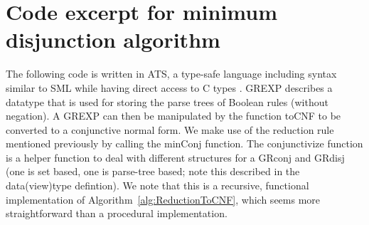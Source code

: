 \section{Code excerpt for minimum disjunction algorithm}
\label{sec:code}

The following code is written in ATS, a type-safe language including
syntax similar to SML while having direct access to C types
\citep{ATStypes03}. GREXP describes a datatype that is used for
storing the parse trees of Boolean rules (without negation).  A GREXP
can then be manipulated by the function toCNF to be converted to a
conjunctive normal form. We make use of the reduction rule mentioned
previously by calling the minConj function. The conjunctivize function
is a helper function to deal with different structures for a GRconj
and GRdisj (one is set based, one is parse-tree based; note this
described in the data(view)type defintion). We note that this is a
recursive, functional implementation of
Algorithm~\ref{alg:ReductionToCNF}, which seems more straightforward
than a procedural implementation.

